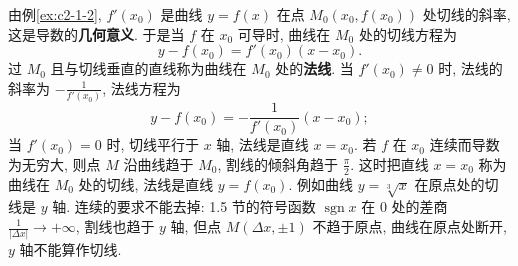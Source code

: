 \documentclass[UTF8,openany]{ctexbook}
\theoremstyle{chinesetextbook}
\begin{document}
由例\ref{ex:c2-1-2}, $f'(x_0)$ 是曲线 $y=f(x)$ 在点 $M_0(x_0,f(x_0))$ 处切线的斜率, 这是导数的\textbf{几何意义}. 于是当 $f$ 在 $x_0$ 可导时, 曲线在 $M_0$ 处的切线方程为
\[
y-f(x_0)=f'(x_0)(x-x_0).
\]
过 $M_0$ 且与切线垂直的直线称为曲线在 $M_0$ 处的\textbf{法线}. 当 $f'(x_0)\ne0$ 时, 法线的斜率为 $\displaystyle-\frac1{f'(x_0)}$, 法线方程为
\[
y-f(x_0)=-\frac1{f'(x_0)}(x-x_0);
\]
当 $f'(x_0)=0$ 时, 切线平行于 $x$ 轴, 法线是直线 $x=x_0$. 若 $f$ 在 $x_0$ 连续而导数为无穷大, 则点 $M$ 沿曲线趋于 $M_0$, 割线的倾斜角趋于 $\displaystyle\frac\pi2$. 这时把直线 $x=x_0$ 称为曲线在 $M_0$ 处的切线, 法线是直线 $y=f(x_0)$. 例如曲线 $y=\sqrt[3]x$ 在原点处的切线是 $y$ 轴. 连续的要求不能去掉: 1.5 节的符号函数 $\operatorname{sgn}x$ 在 $0$ 处的差商 $\displaystyle\frac1{|\Delta x|}\to+\infty$, 割线也趋于 $y$ 轴, 但点 $M(\Delta x,\pm1)$ 不趋于原点, 曲线在原点处断开, $y$ 轴不能算作切线.
\end{document}
